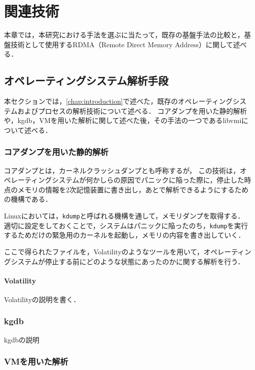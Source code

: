 \chapter{関連技術}
\label{chap:related_works}

本章では，本研究における手法を選ぶに当たって，既存の基盤手法の比較と，基盤技術として使用するRDMA（Remote Direct Memory Address）に関して述べる．

\section{オペレーティングシステム解析手段}

本セクションでは，\ref{chap:introduction}で述べた，既存のオペレーティングシステムおよびプロセスの解析技術について述べる．
コアダンプを用いた静的解析や，kgdb，VMを用いた解析に関して述べた後，その手法の一つであるlibvmiについて述べる．

\subsection{コアダンプを用いた静的解析}

コアダンプとは，カーネルクラッシュダンプとも呼称する\cite{dump}が，
この技術は，オペレーティングシステムが何かしらの原因でパニックに陥った際に，停止した時点のメモリの情報を2次記憶装置に書き出し，あとで解析できるようにするための機構である．

Linuxにおいては，\verb|kdump|と呼ばれる機構を通して，メモリダンプを取得する．
適切に設定をしておくことで，システムはパニックに陥ったのち，\verb|kdump|を実行するためだけの緊急用のカーネルを起動し，メモリの内容を書き出していく．

ここで得られたファイルを，Volatility\cite{Volatility}のようなツールを用いて，オペレーティングシステムが停止する前にどのような状態にあったのかに関する解析を行う．

\subsubsection{Volatility}
\label{subsubsection:Volatility}

Volatilityの説明を書く．

\subsection{kgdb}

kgdbの説明

\subsection{VMを用いた解析}

